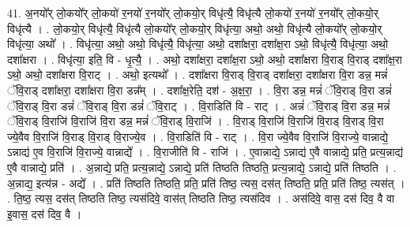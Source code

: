 \documentclass[17pt]{extarticle}
\begin{document}
41. अ॒नयो᳚र् लो॒कयो᳚र् लो॒कयो॑ र॒नयो॑ र॒नयो᳚र् लो॒कयो॒र् विधृ॑त्यै॒ विधृ॑त्यै लो॒कयो॑ र॒नयो॑ र॒नयो᳚र् लो॒कयो॒र् विधृ॑त्यै । . लो॒कयो॒र् विधृ॑त्यै॒ विधृ॑त्यै लो॒कयो᳚र् लो॒कयो॒र् विधृ॑त्या॒ अथो॒ अथो॒ विधृ॑त्यै लो॒कयो᳚र् लो॒कयो॒र् विधृ॑त्या॒ अथो᳚ । . विधृ॑त्या॒ अथो॒ अथो॒ विधृ॑त्यै॒ विधृ॑त्या॒ अथो॒ दशा᳚क्षरा॒ दशा᳚क्ष॒रा ऽथो॒ विधृ॑त्यै॒ विधृ॑त्या॒ अथो॒ दशा᳚क्षरा । . विधृ॑त्या॒ इति॒ वि - धृ॒त्यै॒ । . अथो॒ दशा᳚क्षरा॒ दशा᳚क्ष॒रा ऽथो॒ अथो॒ दशा᳚क्षरा वि॒राड् वि॒राड् दशा᳚क्ष॒रा ऽथो॒ अथो॒ दशा᳚क्षरा वि॒राट् । . अथो॒ इत्यथो᳚ । . दशा᳚क्षरा वि॒राड् वि॒राड् दशा᳚क्षरा॒ दशा᳚क्षरा वि॒रा डन्न॒ मन्नं॑ ॅवि॒राड् दशा᳚क्षरा॒ दशा᳚क्षरा वि॒रा डन्न᳚म् । . दशा᳚क्ष॒रेति॒ दश॑ - अ॒क्ष॒रा॒ । . वि॒रा डन्न॒ मन्नं॑ ॅवि॒राड् वि॒रा डन्नं॑ ॅवि॒राड् वि॒रा डन्नं॑ ॅवि॒राड् वि॒रा डन्नं॑ ॅवि॒राट् । . वि॒राडिति॑ वि - राट् । . अन्नं॑ ॅवि॒राड् वि॒रा डन्न॒ मन्नं॑ ॅवि॒राड् वि॒राजि॑ वि॒राजि॑ वि॒रा डन्न॒ मन्नं॑ ॅवि॒राड् वि॒राजि॑ । . वि॒राड् वि॒राजि॑ वि॒राजि॑ वि॒राड् वि॒राड् वि॒रा ज्ये॒वैव वि॒राजि॑ वि॒राड् वि॒राड् वि॒राज्ये॒व । . वि॒राडिति॑ वि - राट् । . वि॒रा ज्ये॒वैव वि॒राजि॑ वि॒राज्ये॒ वान्नाद्ये॒ ऽन्नाद्य॑ ए॒व वि॒राजि॑ वि॒राज्ये॒ वान्नाद्ये᳚ । . वि॒राजीति॑ वि - राजि॑ । . ए॒वान्नाद्ये॒ ऽन्नाद्य॑ ए॒वै वान्नाद्ये॒ प्रति॒ प्रत्य॒न्नाद्य॑ ए॒वै वान्नाद्ये॒ प्रति॑ । . अ॒न्नाद्ये॒ प्रति॒ प्रत्य॒न्नाद्ये॒ ऽन्नाद्ये॒ प्रति॑ तिष्ठति तिष्ठति॒ प्रत्य॒न्नाद्ये॒ ऽन्नाद्ये॒ प्रति॑ तिष्ठति । . अ॒न्नाद्य॒ इत्य॑न्न - अद्ये᳚ । . प्रति॑ तिष्ठति तिष्ठति॒ प्रति॒ प्रति॑ तिष्ठ॒ त्यस॒ दस॑त् तिष्ठति॒ प्रति॒ प्रति॑ तिष्ठ॒ त्यस॑त् । . ति॒ष्ठ॒ त्यस॒ दस॑त् तिष्ठति तिष्ठ॒ त्यस॑दिवे॒ वास॑त् तिष्ठति तिष्ठ॒ त्यस॑दिव । . अस॑दिवे॒ वास॒ दस॑ दिव॒ वै वा इ॒वास॒ दस॑ दिव॒ वै । \newline
\end{document}

